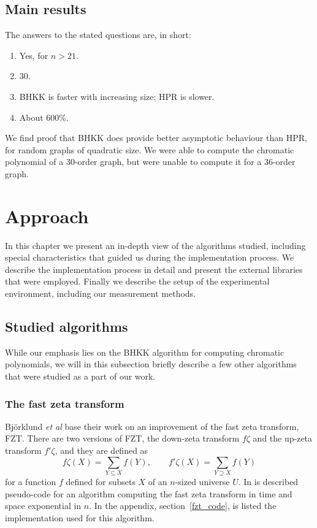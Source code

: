 \documentclass{cslthse-msc}
\begin{document}
\section{Main results}
The answers to the stated questions are, in short:

\begin{enumerate}
 \item Yes, for $n > 21$.
 \item 30.
 \item BHKK is faster with increasing size; HPR is slower.
 \item About 600\%.
\end{enumerate}

We find proof that BHKK does provide better asymptotic behaviour than HPR, for random graphs of quadratic size. We were able to compute the chromatic polynomial of a 30-order graph, but were unable to compute it for a 36-order graph.

\chapter{Approach}
In this chapter we present an in-depth view of the algorithms studied, including special characteristics that guided us during the implementation process. We describe the implementation process in detail and present the external libraries that were employed. Finally we describe the setup of the experimental environment, including our measurement methods.


\section{Studied algorithms}
While our emphasis lies on the BHKK algorithm for computing chromatic polynomials, we will in this subsection briefly describe a few other algorithms that were studied as a part of our work.

\subsection{The fast zeta transform}\label{fzt_algorithm}
Björklund \emph{et al} \cite{cov_pack} base their work on an improvement of the fast zeta transform, FZT. There are two versions of FZT, the down-zeta transform $f\zeta$ and the up-zeta transform $f'\zeta$, and they are defined as
\[
 f\zeta(X) = \sum_{Y \subseteq X} f(Y), \qquad f'\zeta(X) = \sum_{Y \supseteq X} f(Y)
\]
for a function $f$ defined for subsets $X$ of an $n$-sized universe $U$. In \cite[p.5]{cov_pack} is described pseudo-code for an algorithm computing the fast zeta transform in time and space exponential in $n$. In the appendix, section~\ref{fzt_code}, is listed the implementation used for this algorithm.
\end{document}
